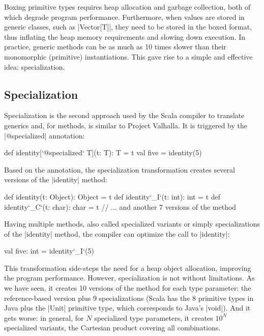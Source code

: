 Boxing primitive types requires heap allocation and garbage collection, both of which degrade program performance. Furthermore, when values are stored in generic classes, such as |Vector[T]|, they need to be stored in the boxed format, thus inflating the heap memory requirements and slowing down execution. In practice, generic methods can be as much as 10 times slower than their monomorphic (primitive) instantiations. This gave rise to a simple and effective idea: specialization.

\subsection{Specialization}

Specialization \cite{specialization-iuli, iuli-thesis} is the second approach used by the Scala compiler to translate generics and, for methods, is similar to Project Valhalla. It is triggered by the |@specialized| annotation:

\begin{lstlisting-nobreak}
 def identity[`@specialized` T](t: T): T = t
 val five = identity(5)
\end{lstlisting-nobreak}

Based on the annotation, the specialization transformation creates several versions of the |identity| method:

\begin{lstlisting-nobreak}
 def identity(t: Object): Object = t
 def identity`_I`(t: int): int = t
 def identity`_C`(t: char): char = t
 // ... and another 7 versions of the method
\end{lstlisting-nobreak}

Having multiple methods, also called specialized variants or simply specializations of the |identity| method, the compiler can optimize the call to |identity|:

\begin{lstlisting-nobreak}
 val five: int = identity`_I`(5)
\end{lstlisting-nobreak}

This transformation side-steps the need for a heap object allocation, improving the program performance. However, specialization is not without limitations. As we have seen, it creates 10 versions of the method for each type parameter: the reference-based version plus 9 specializations (Scala has the 8 primitive types in Java plus the |Unit| primitive type, which corresponds to Java's |void|). And it gets worse: in general, for $N$ specialized type parameters, it creates $10^N$ specialized variants, the Cartesian product covering all combinations.

